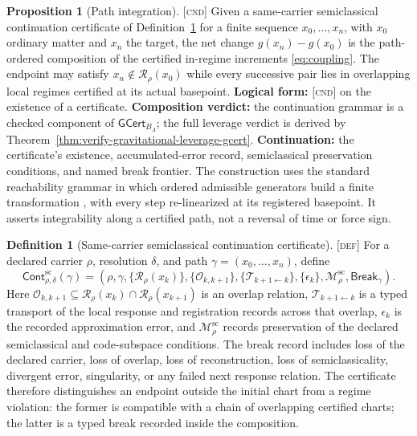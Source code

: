 \documentclass[11pt]{article}
\newcommand{\GCcert}{\ensuremath{\mathsf{GCert}}}
\newcommand{\Defn}{\textsc{[def]}}
\newcommand{\Cnd}{\textsc{[cnd]}}
\theoremstyle{definition}
\newtheorem{sdefinition}{Definition}
\newtheorem{sproposition}{Proposition}
\begin{document}
\begin{sproposition}[Path integration]\label{prop:integration}
\Cnd{} Given a same-carrier semiclassical continuation certificate of
Definition~\ref{def:semiclassical-continuation-certificate} for a finite sequence
$x_0,\dots,x_n$, with $x_0$ ordinary matter and $x_n$ the target, the net change
$g(x_n)-g(x_0)$ is the path-ordered composition of the certified in-regime
increments \eqref{eq:coupling}. The endpoint may satisfy
$x_n\notin\mathcal R_{\rho}(x_0)$ while every successive pair lies in overlapping
local regimes certified at its actual basepoint. \textbf{Logical form:} \Cnd{} on
the existence of a certificate. \textbf{Composition verdict:} the continuation
grammar is a checked component of $\GCcert_{B_\Lambda}$; the full leverage verdict
is derived by Theorem~\ref{thm:verify-gravitational-leverage-gcert}.
\textbf{Continuation:} the certificate's existence, accumulated-error record,
semiclassical preservation conditions, and named break frontier. The construction uses the standard reachability grammar in
which ordered admissible generators build a finite transformation
\cite{S_JurdjevicSussmann1972}, with every step re-linearized at its registered
basepoint. It asserts integrability along a certified path, not a reversal of time
or force sign.
\end{sproposition}

\begin{sdefinition}[Same-carrier semiclassical continuation certificate]
\label{def:semiclassical-continuation-certificate}
\Defn{} For a declared carrier $\rho$, resolution $\delta$, and path
$\gamma=(x_0,\ldots,x_n)$, define
\begin{equation}
\mathsf{Cont}^{\mathrm{sc}}_{\rho,\delta}(\gamma)=
\left(
\rho,\gamma,\{\mathcal R_{\rho}(x_k)\},\{\mathcal O_{k,k+1}\},
\{\mathcal T_{k+1\leftarrow k}\},\{\epsilon_k\},
\mathcal M^{\mathrm{sc}}_{\rho},\mathsf{Break}_{\gamma}
\right).
\label{eq:semiclassical-continuation-certificate}
\end{equation}
Here $\mathcal O_{k,k+1}\subseteq\mathcal R_{\rho}(x_k)\cap
\mathcal R_{\rho}(x_{k+1})$ is an overlap relation, $\mathcal T_{k+1\leftarrow k}$
is a typed transport of the local response and registration records across that
overlap, $\epsilon_k$ is the recorded approximation error, and
$\mathcal M^{\mathrm{sc}}_{\rho}$ records preservation of the declared
semiclassical and code-subspace conditions. The break record includes loss of the
declared carrier, loss of overlap, loss of reconstruction, loss of semiclassicality,
divergent error, singularity, or any failed next response relation. The certificate
therefore distinguishes an endpoint outside the initial chart from a regime
violation: the former is compatible with a chain of overlapping certified charts;
the latter is a typed break recorded inside the composition.
\end{sdefinition}
\end{document}
